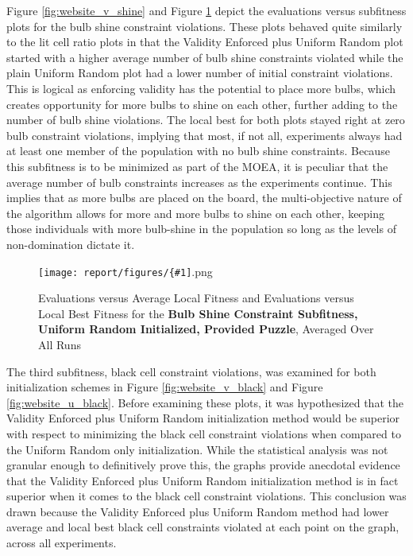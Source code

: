 \documentclass[11pt]{article}
\newcommand{\fitnessplotcaption}[1]{\caption{Evaluations versus Average Local Fitness and Evaluations versus 
    Local Best Fitness for the \textbf{{#1}}, Averaged Over All Runs}}
\newcommand{\addgraphic}[1]{\centerline{\texttt{[image: report/figures/\{\#1]}.png}}}
\begin{document}
Figure \ref{fig:website_v_shine} and Figure \ref{fig:website_u_shine} depict the evaluations versus
subfitness plots for the bulb shine constraint violations. These plots behaved quite similarly to the
lit cell ratio plots in that the Validity Enforced plus Uniform Random plot started with a higher average
number of bulb shine constraints violated while the plain Uniform Random plot had a lower number of
initial constraint violations. This is logical as enforcing validity has the potential to place more bulbs,
which creates opportunity for more bulbs
to shine on each other, further adding to the number of bulb shine violations. The local best for both
plots stayed right at zero bulb constraint violations, implying that most, if not all, experiments always had
at least one member of the population with no bulb shine constraints. Because this subfitness is to be
minimized as part of the MOEA, it is peculiar that the average number of bulb constraints increases as 
the experiments continue. This implies that as more bulbs are placed on the board, the multi-objective
nature of the algorithm allows for more and more bulbs to shine on each other, keeping those individuals
with more bulb-shine in the population so long as the levels of non-domination dictate it.

\begin{figure}[H]
    \addgraphic{website_puzzle_uniform_random_init_bulb_shine_constr__graph}
    \fitnessplotcaption{Bulb Shine Constraint Subfitness, Uniform Random Initialized, Provided Puzzle}
    \label{fig:website_u_shine}
\end{figure}


The third subfitness, black cell constraint violations, was examined for both initialization
schemes in Figure \ref{fig:website_v_black} and Figure \ref{fig:website_u_black}. Before examining
these plots, it was hypothesized that the Validity Enforced plus Uniform Random initialization 
method would be superior with respect to minimizing the black cell constraint violations when compared
to the Uniform Random only initialization. While the statistical analysis was not granular enough to
definitively prove this, the graphs provide anecdotal evidence that the Validity Enforced plus Uniform
Random initialization method is in fact superior when it comes to the black cell constraint violations.
This conclusion was drawn because the Validity Enforced plus Uniform Random method had lower average and
local best black cell constraints violated at each point on the graph, across all experiments.
\end{document}
